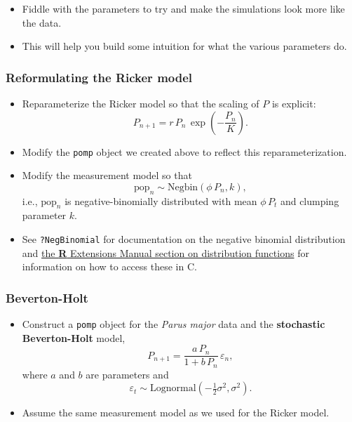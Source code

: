 \documentclass[]{article}
\begin{document}
\begin{itemize}
\item
  Fiddle with the parameters to try and make the simulations look more
  like the data.
\item
  This will help you build some intuition for what the various
  parameters do.
\end{itemize}

\subsubsection{Reformulating the Ricker
model}\label{reformulating-the-ricker-model}

\begin{itemize}
\item
  Reparameterize the Ricker model so that the scaling of \(P\) is
  explicit: \[P_{n+1} = r\,P_{n}\,\exp\left(-\frac{P_{n}}{K}\right).\]
\item
  Modify the \texttt{pomp} object we created above to reflect this
  reparameterization.
\item
  Modify the measurement model so that
  \[\mathrm{pop}_n \sim \mathrm{Negbin}(\phi\,P_n,k),\] i.e.,
  \(\mathrm{pop}_n\) is negative-binomially distributed with mean
  \(\phi\,P_t\) and clumping parameter \(k\).
\item
  See \texttt{?NegBinomial} for documentation on the negative binomial
  distribution and
  \href{http://cran.r-project.org/doc/manuals/r-release/R-exts.html\#Distribution-functions}{the
  \textbf{R} Extensions Manual section on distribution functions} for
  information on how to access these in C.
\end{itemize}

\subsubsection{Beverton-Holt}\label{beverton-holt}

\begin{itemize}
\item
  Construct a \texttt{pomp} object for the \emph{Parus major} data and
  the \textbf{stochastic Beverton-Holt} model,
  \[P_{n+1} = \frac{a\,P_n}{1+b\,P_n}\,\varepsilon_n,\] where \(a\) and
  \(b\) are parameters and
  \[\varepsilon_t \sim \mathrm{Lognormal}(-\tfrac{1}{2}\sigma^2,\sigma^2).\]
\item
  Assume the same measurement model as we used for the Ricker model.
\end{itemize}
\end{document}
